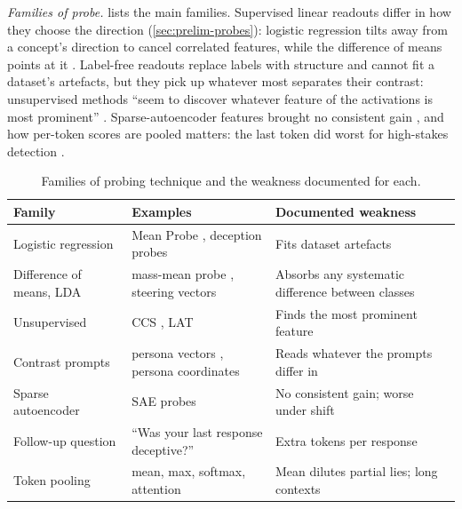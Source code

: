\emph{Families of probe.}  lists the main families. Supervised linear readouts
differ in how they choose the direction (\cref{sec:prelim-probes}): logistic regression tilts away from
a concept's direction to cancel correlated features, while the difference of means points at it
\cite{marks2023geometry}. Label-free readouts replace labels with structure and cannot fit a dataset's
artefacts, but they pick up whatever most separates their contrast: unsupervised methods ``seem to
discover whatever feature of the activations is most prominent'' \cite{farquhar2023challenges}.
Sparse-autoencoder features brought no consistent gain \cite{kantamneni2025sparse}, and how per-token
scores are pooled matters: the last token did worst for high-stakes detection
\cite{mckenzie2025highstakes}.

\begin{table}[t]
\centering
\small
\caption[Families of probing technique]{Families of probing technique and the weakness documented for
each.}
\label{tab:probes}
\begin{tabularx}{\linewidth}{@{}>{\raggedright\arraybackslash}p{3.0cm}>{\raggedright\arraybackslash}p{4.6cm}>{\raggedright\arraybackslash}X@{}}
\toprule
Family & Examples & Documented weakness \\
\midrule
Logistic regression & Mean Probe \cite{kretschmar2025liars}, deception probes
\cite{goldowskydill2025detecting} & Fits dataset artefacts \cite{levinstein2025still} \\
Difference of means, LDA & mass-mean probe \cite{marks2023geometry}, steering vectors
\cite{rimsky2024steering} & Absorbs any systematic difference between classes \\
Unsupervised & CCS \cite{burns2023discovering}, LAT \cite{zou2023representation} & Finds the most
prominent feature \cite{farquhar2023challenges} \\
Contrast prompts & persona vectors \cite{chen2025persona}, persona coordinates
\cite{mahadik2026persona} & Reads whatever the prompts differ in \\
Sparse autoencoder & SAE probes \cite{kantamneni2025sparse} & No consistent gain; worse under shift \\
Follow-up question & ``Was your last response deceptive?'' \cite{goldowskydill2025detecting} & Extra
tokens per response \\
Token pooling & mean, max, softmax, attention \cite{mckenzie2025highstakes} & Mean dilutes partial
lies; long contexts \cite{kramar2026production} \\
\bottomrule
\end{tabularx}
\end{table}

